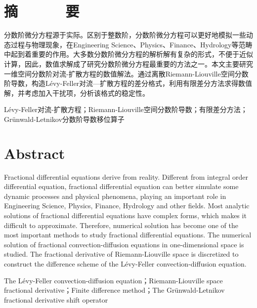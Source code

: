 \pagestyle{plain}
\chapter*{摘~~~~~~要}
\songti \xiaosihao
分数阶微分方程源于实际。区别于整数阶，分数阶微分方程可以更好地模拟一些动态过程与物理现象，在Engineering Science、Physics、Finance、Hydrology等范畴中起到着重要的作用。大多数分数阶微分方程的解析解有复杂的形式，不便于近似计算，因此，数值求解成了研究分数阶微分方程最重要的方法之一。本文主要研究一维空间分数阶对流-扩散方程的数值解法。通过离散Riemann-Liouville空间分数阶导数，构造Lévy-Feller对流—扩散方程的差分格式，利用有限差分方法求得数值解，并考虑加入干扰项，分析该格式的稳定性。

\vskip 0.4cm
Lévy-Feller对流-扩散方程\cite{lqx2007}\cite{Liu2007Approximation}；Riemann-Liouville空间分数阶导数；有限差分方法；Grünwald-Letnikov分数阶导数移位算子
\chapter*{\bf Abstract}
\setlength{\baselineskip}{20pt plus2pt minus1pt} %

Fractional differential equations derive from reality. Different from integral order differential equation, fractional differential equation can better simulate some dynamic processes and physical phenomena, playing an important role in Engineering Science, Physics, Finance, Hydrology and other fields. Most analytic solutions of fractional differential equations have complex forms, which makes it difficult to approximate. Therefore, numerical solution has become one of the most important methods to study fractional differential equations. The numerical solution of fractional convection-diffusion equations in one-dimensional space is studied. The fractional derivative of Riemann-Liouville space is discretized to construct the difference scheme of the Lévy-Feller convection-diffusion equation.


\vskip 0.2cm
 The Lévy-Feller convection-diffusion equation；Riemann-Liouville space fractional derivative；Finite difference method；The Grünwald-Letnikov fractional derivative shift operator
\setlength{\baselineskip}{20pt plus2pt minus1pt} %
